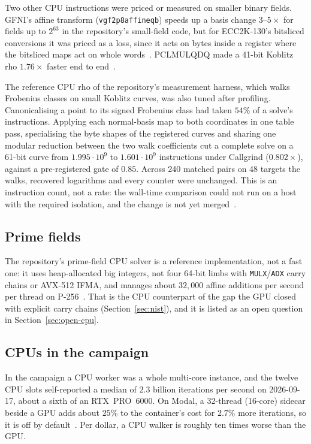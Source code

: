 Two other CPU instructions were priced or measured on smaller binary
fields. GFNI's affine transform (\texttt{vgf2p8affineqb}) speeds up a
basis change $3$--$5\times$ for fields up to $2^{63}$ in the repository's
small-field code, but for ECC2K-130's bitsliced conversions it was
priced as a loss, since it acts on bytes inside a register where the
bitsliced maps act on whole words~. PCLMULQDQ made a
41-bit Koblitz rho $1.76\times$ faster end to end~.

The reference CPU rho of the repository's measurement harness, which
walks Frobenius classes on small Koblitz curves, was also tuned after
profiling. Canonicalising a point to its signed Frobenius class had
taken $54\%$ of a solve's instructions. Applying each normal-basis map
to both coordinates in one table pass, specialising the byte shapes of
the registered curves and sharing one modular reduction between the
two walk coefficients cut a complete solve on a 61-bit curve from
$1.995\cdot10^9$ to $1.601\cdot10^9$ instructions under Callgrind
($0.802\times$), against a pre-registered gate of $0.85$. Across 240
matched pairs on 48 targets the walks, recovered logarithms and every
counter were unchanged. This is an instruction count, not a rate: the
wall-time comparison could not run on a host with the required
isolation, and the change is not yet merged~.

\subsection{Prime fields}
\label{sec:cpu-prime}

The repository's prime-field CPU solver is a reference implementation,
not a fast one: it uses heap-allocated big integers, not four 64-bit
limbs with \texttt{MULX}/\texttt{ADX} carry chains or AVX-512 IFMA, and
manages about $32{,}000$ affine additions per second per thread on
P-256~. That is the CPU counterpart of the gap the
GPU closed with explicit carry chains (Section~\ref{sec:nist}), and it is
listed as an open question in Section~\ref{sec:open-cpu}.

\subsection{CPUs in the campaign}
\label{sec:cpu-fleet}

In the campaign a CPU worker was a whole multi-core instance, and the
twelve CPU slots self-reported a median of $2.3$ billion iterations per
second on 2026-09-17, about a sixth of an RTX~PRO~6000. On Modal, a
32-thread (16-core) sidecar beside a GPU adds about $25\%$ to the
container's cost for $2.7\%$ more iterations, so it is off by
default~.
Per dollar, a CPU walker is roughly ten times worse than the GPU.


